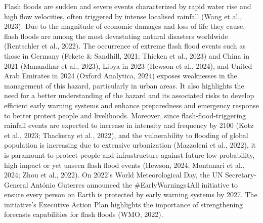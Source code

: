 Flash floods are sudden and severe events characterized by rapid water rise and high flow velocities, often triggered by intense localised rainfall (Wang et al., 2023). Due to the magnitude of economic damages and loss of life they cause, flash floods are among the most devastating natural disasters worldwide (Rentschler et al., 2022). The occurrence of extreme flash flood events such as those in Germany (Fekete & Sandhill, 2021; Thieken et al., 2023) and China in 2021 (Manandhar et al., 2023), Libya in 2023 (Hewson et al., 2024), and United Arab Emirates in 2024 (Oxford Analytica, 2024) exposes weaknesses in the management of this hazard, particularly in urban areas. It also highlights the need for a better understanding of the hazard and its associated risks to develop efficient early warning systems and enhance preparedness and emergency response to better protect people and livelihoods. Moreover, since flash-flood-triggering rainfall events are expected to increase in intensity and frequency by 2100 (Kotz et al., 2023; Thackeray et al., 2022), and the vulnerability to flooding of global population is increasing due to extensive urbanization (Mazzoleni et al., 2022), it is paramount to protect people and infrastructure against future low-probability, high impact or yet unseen flash flood events (Hewson, 2024; Montanari et al., 2024; Zhou et al., 2022). On 2022’s World Meteorological Day, the UN Secretary-General António Guterres announced the #EarlyWarnings4All initiative to ensure every person on Earth is protected by early warning systems by 2027. The initiative’s Executive Action Plan highlights the importance of strengthening forecasts capabilities for flash floods (WMO, 2022). 

